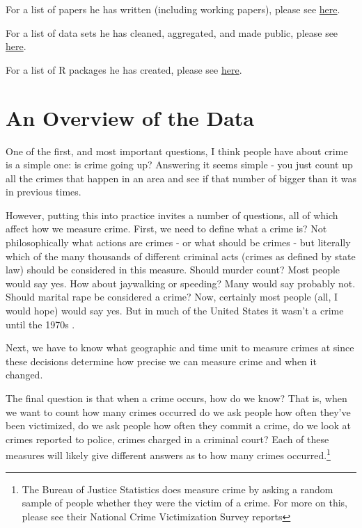 \documentclass[
  12pt,
  openany]{book}
\begin{document}
For a list of papers he has written (including working papers), please see \href{http://jacobdkaplan.com/research.html}{here}.

For a list of data sets he has cleaned, aggregated, and made public, please see \href{http://jacobdkaplan.com/data.html}{here}.

For a list of R packages he has created, please see \href{https://jacobdkaplan.com/packages.html}{here}.

\hypertarget{ucr_general}{%
\chapter{An Overview of the Data}\label{ucr_general}}

One of the first, and most important questions, I think people have about crime is a simple one: is crime going up? Answering it seems simple - you just count up all the crimes that happen in an area and see if that number of bigger than it was in previous times.

However, putting this into practice invites a number of questions, all of which affect how we measure crime. First, we need to define what a crime is? Not philosophically what actions are crimes - or what should be crimes - but literally which of the many thousands of different criminal acts (crimes as defined by state law) should be considered in this measure. Should murder count? Most people would say yes. How about jaywalking or speeding? Many would say probably not. Should marital rape be considered a crime? Now, certainly most people (all, I would hope) would say yes. But in much of the United States it wasn't a crime until the 1970s \citep{bennice2003marital, mcmahon2009criminalizing}.

Next, we have to know what geographic and time unit to measure crimes at since these decisions determine how precise we can measure crime and when it changed.

The final question is that when a crime occurs, how do we know? That is, when we want to count how many crimes occurred do we ask people how often they've been victimized, do we ask people how often they commit a crime, do we look at crimes reported to police, crimes charged in a criminal court? Each of these measures will likely give different answers as to how many crimes occurred.\footnote{The Bureau of Justice Statistics does measure crime by asking a random sample of people whether they were the victim of a crime. For more on this, please see their National Crime Victimization Survey reports}
\end{document}
